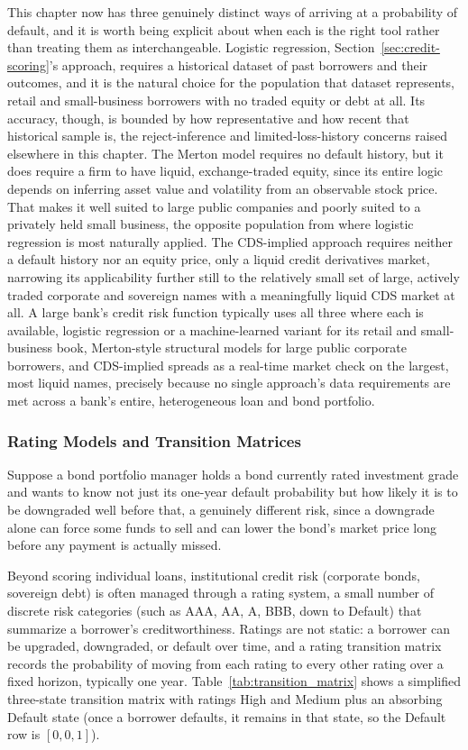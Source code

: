 \documentclass[../ai_in_finance]{subfiles}
\begin{document}
This chapter now has three genuinely distinct ways of arriving at a probability of default, and it is worth being explicit about when each is the right tool rather than treating them as interchangeable. Logistic regression, Section~\ref{sec:credit-scoring}'s approach, requires a historical dataset of past borrowers and their outcomes, and it is the natural choice for the population that dataset represents, retail and small-business borrowers with no traded equity or debt at all. Its accuracy, though, is bounded by how representative and how recent that historical sample is, the reject-inference and limited-loss-history concerns raised elsewhere in this chapter.
The Merton model requires no default history, but it does require a firm to have liquid, exchange-traded equity, since its entire logic depends on inferring asset value and volatility from an observable stock price. That makes it well suited to large public companies and poorly suited to a privately held small business, the opposite population from where logistic regression is most naturally applied.
The CDS-implied approach requires neither a default history nor an equity price, only a liquid credit derivatives market, narrowing its applicability further still to the relatively small set of large, actively traded corporate and sovereign names with a meaningfully liquid CDS market at all.
A large bank's credit risk function typically uses all three where each is available, logistic regression or a machine-learned variant for its retail and small-business book, Merton-style structural models for large public corporate borrowers, and CDS-implied spreads as a real-time market check on the largest, most liquid names, precisely because no single approach's data requirements are met across a bank's entire, heterogeneous loan and bond portfolio.

\subsubsection*{Rating Models and Transition Matrices}
\label{sec:rating-transition}

Suppose a bond portfolio manager holds a bond currently rated investment grade and wants to know not just its one-year default probability but how likely it is to be downgraded well before that, a genuinely different risk, since a downgrade alone can force some funds to sell and can lower the bond's market price long before any payment is actually missed.

Beyond scoring individual loans, institutional credit risk (corporate bonds, sovereign debt) is often managed through a rating system, a small number of discrete risk categories (such as AAA, AA, A, BBB, down to Default) that summarize a borrower's creditworthiness. Ratings are not static: a borrower can be upgraded, downgraded, or default over time, and a rating transition matrix records the probability of moving from each rating to every other rating over a fixed horizon, typically one year. Table~\ref{tab:transition_matrix} shows a simplified three-state transition matrix with ratings High and Medium plus an absorbing Default state (once a borrower defaults, it remains in that state, so the Default row is $[0,0,1]$).
\end{document}
